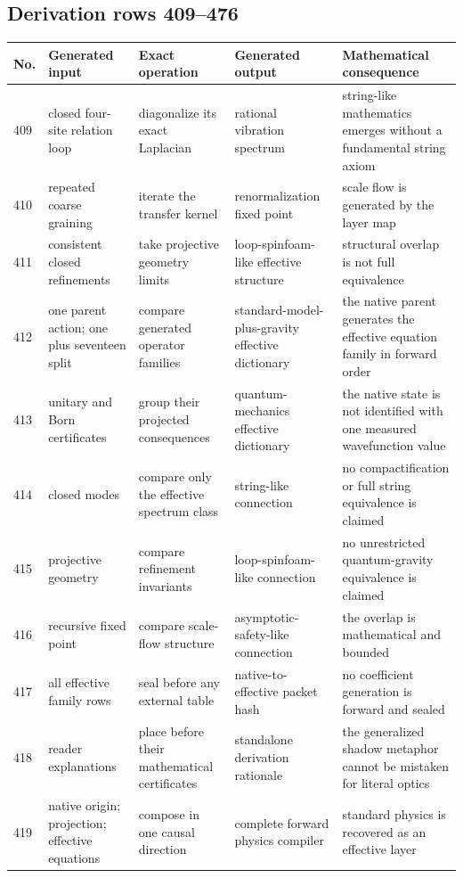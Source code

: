 \documentclass[11pt]{article}
\numberwithin{equation}{section}
\theoremstyle{remark}
\begin{document}
\begin{landscape}
\subsection{Derivation rows 409--476}
\begin{longtable}{p{0.65cm}p{3.5cm}p{4.0cm}p{4.0cm}p{4.6cm}}
\toprule No.&Generated input&Exact operation&Generated output&Mathematical consequence\\\midrule\endhead
409&closed four-site relation loop&diagonalize its exact Laplacian&rational vibration spectrum&string-like mathematics emerges without a fundamental string axiom\\
410&repeated coarse graining&iterate the transfer kernel&renormalization fixed point&scale flow is generated by the layer map\\
411&consistent closed refinements&take projective geometry limits&loop-spinfoam-like effective structure&structural overlap is not full equivalence\\
412&one parent action; one plus seventeen split&compare generated operator families&standard-model-plus-gravity effective dictionary&the native parent generates the effective equation family in forward order\\
413&unitary and Born certificates&group their projected consequences&quantum-mechanics effective dictionary&the native state is not identified with one measured wavefunction value\\
414&closed modes&compare only the effective spectrum class&string-like connection&no compactification or full string equivalence is claimed\\
415&projective geometry&compare refinement invariants&loop-spinfoam-like connection&no unrestricted quantum-gravity equivalence is claimed\\
416&recursive fixed point&compare scale-flow structure&asymptotic-safety-like connection&the overlap is mathematical and bounded\\
417&all effective family rows&seal before any external table&native-to-effective packet hash&no coefficient generation is forward and sealed\\
418&reader explanations&place before their mathematical certificates&standalone derivation rationale&the generalized shadow metaphor cannot be mistaken for literal optics\\
419&native origin; projection; effective equations&compose in one causal direction&complete forward physics compiler&standard physics is recovered as an effective layer\\

\end{longtable}
\end{landscape}
\end{document}

